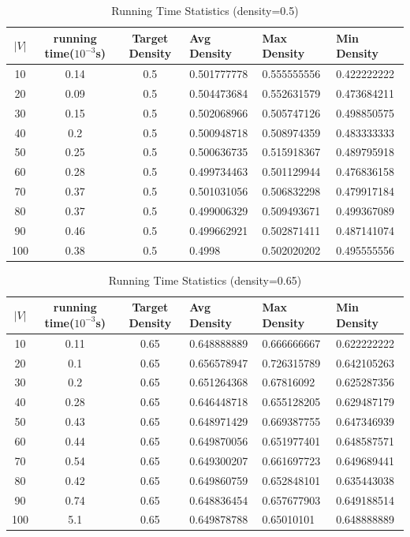 \documentclass[paper=a4, fontsize=11pt]{scrartcl} %
\numberwithin{equation}{section} %
\numberwithin{figure}{section} %
\numberwithin{table}{section} %
\begin{document}
\begin{table}[H]
    \centering
    \begin{tabular}{ccclll}
    \toprule
$|V|$ & running time($10^{-3}$s) & Target Density & Avg Density & Max Density & Min Density\\ 
       \midrule
10 & 0.14 & 0.5 & 0.501777778 & 0.555555556 & 0.422222222\\ 
20 & 0.09 & 0.5 & 0.504473684 & 0.552631579 & 0.473684211\\ 
30 & 0.15 & 0.5 & 0.502068966 & 0.505747126 & 0.498850575\\ 
40 & 0.2 & 0.5 & 0.500948718 & 0.508974359 & 0.483333333\\ 
50 & 0.25 & 0.5 & 0.500636735 & 0.515918367 & 0.489795918\\ 
60 & 0.28 & 0.5 & 0.499734463 & 0.501129944 & 0.476836158\\ 
70 & 0.37 & 0.5 & 0.501031056 & 0.506832298 & 0.479917184\\ 
80 & 0.37 & 0.5 & 0.499006329 & 0.509493671 & 0.499367089\\ 
90 & 0.46 & 0.5 & 0.499662921 & 0.502871411 & 0.487141074\\ 
100 & 0.38 & 0.5 & 0.4998 & 0.502020202 & 0.495555556\\ 
      \bottomrule
    \end{tabular}
    \caption{Running Time Statistics (density=0.5)}
    \label{tab:running time (density=0.5)}
\end{table}

\begin{table}[H]
    \centering
    \begin{tabular}{ccclll}
    \toprule
$|V|$ & running time($10^{-3}$s) & Target Density & Avg Density & Max Density & Min Density\\ 
       \midrule
10 & 0.11 & 0.65 & 0.648888889 & 0.666666667 & 0.622222222\\ 
20 & 0.1 & 0.65 & 0.656578947 & 0.726315789 & 0.642105263\\ 
30 & 0.2 & 0.65 & 0.651264368 & 0.67816092 & 0.625287356\\ 
40 & 0.28 & 0.65 & 0.646448718 & 0.655128205 & 0.629487179\\ 
50 & 0.43 & 0.65 & 0.648971429 & 0.669387755 & 0.647346939\\ 
60 & 0.44 & 0.65 & 0.649870056 & 0.651977401 & 0.648587571\\ 
70 & 0.54 & 0.65 & 0.649300207 & 0.661697723 & 0.649689441\\ 
80 & 0.42 & 0.65 & 0.649860759 & 0.652848101 & 0.635443038\\ 
90 & 0.74 & 0.65 & 0.648836454 & 0.657677903 & 0.649188514\\ 
100 & 5.1 & 0.65 & 0.649878788 & 0.65010101 & 0.648888889\\ 
      \bottomrule
    \end{tabular}
    \caption{Running Time Statistics (density=0.65)}
    \label{tab:running time (density=0.65)}
\end{table}
\end{document}
